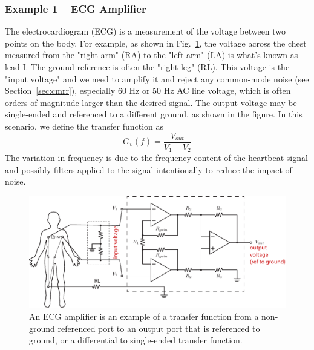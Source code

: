 \subsubsection{Example 1 – ECG Amplifier}
The electrocardiogram (ECG) is a measurement of the voltage between two points on the body.  For example, as shown in Fig.~\ref{fig:ecg}, the voltage across the chest measured from the "right arm" (RA) to the "left arm" (LA) is what's known as lead I.  The ground reference is often the "right leg" (RL).  This voltage is the "input voltage" and we need to amplify it and reject any common-mode noise (see Section~\ref{sec:cmrr}), especially 60 Hz or 50 Hz AC line voltage, which is often orders of magnitude larger than the desired signal.  The output voltage may be single-ended and referenced to a different ground, as shown in the figure. 
In this scenario, we define the transfer function as
    \begin{equation}
        G_v(f) = \frac{V_{out}}{V_1 - V_2 }
    \end{equation}
The variation in frequency is due to the frequency content of the heartbeat signal and possibly filters applied to the signal intentionally to reduce the impact of noise.
\begin{figure}[tb]
\centering
\includegraphics[width=.95\columnwidth]{ex_opamp-ia2}
\caption{An ECG amplifier is an example of a transfer function from a non-ground referenced port to an output port that is referenced to ground, or a differential to single-ended transfer function.} \label{fig:ecg}
\end{figure}
